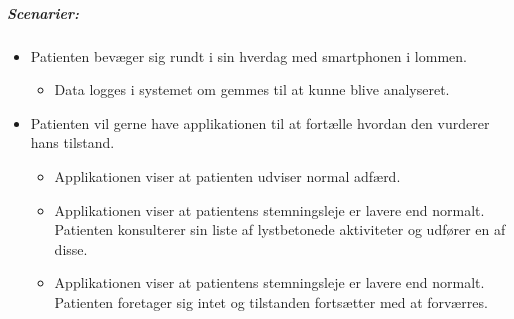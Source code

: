 \subparagraph{Scenarier:}
\begin{itemize}
	\item Patienten bevæger sig rundt i sin hverdag med smartphonen i lommen. 
	\begin{itemize}
		\item Data logges i systemet om gemmes til at kunne blive analyseret.
	\end{itemize}
	
	\item Patienten vil gerne have applikationen til at fortælle hvordan den vurderer hans tilstand.
	\begin{itemize}
		\item Applikationen viser at patienten udviser normal adfærd.
		\item Applikationen viser at patientens stemningsleje er lavere end normalt.
		Patienten konsulterer sin liste af lystbetonede aktiviteter og udfører en af disse.
		\item Applikationen viser at patientens stemningsleje er lavere end normalt.
		Patienten foretager sig intet og tilstanden fortsætter med at forværres.
	\end{itemize}	

\end{itemize}
